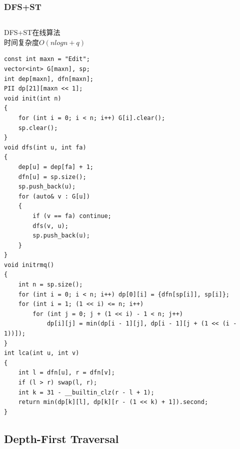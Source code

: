 \documentclass[twoside]{article}
\begin{document}
\subsubsection{DFS+ST}
\begin{lstlisting}
\end{lstlisting}
DFS+ST在线算法\\
时间复杂度$O(nlogn+q)$
\begin{lstlisting}
const int maxn = "Edit";
vector<int> G[maxn], sp;
int dep[maxn], dfn[maxn];
PII dp[21][maxn << 1];
void init(int n)
{
    for (int i = 0; i < n; i++) G[i].clear();
    sp.clear();
}
void dfs(int u, int fa)
{
    dep[u] = dep[fa] + 1;
    dfn[u] = sp.size();
    sp.push_back(u);
    for (auto& v : G[u])
    {
        if (v == fa) continue;
        dfs(v, u);
        sp.push_back(u);
    }
}
void initrmq()
{
    int n = sp.size();
    for (int i = 0; i < n; i++) dp[0][i] = {dfn[sp[i]], sp[i]};
    for (int i = 1; (1 << i) <= n; i++)
        for (int j = 0; j + (1 << i) - 1 < n; j++)
            dp[i][j] = min(dp[i - 1][j], dp[i - 1][j + (1 << (i - 1))]);
}
int lca(int u, int v)
{
    int l = dfn[u], r = dfn[v];
    if (l > r) swap(l, r);
    int k = 31 - __builtin_clz(r - l + 1);
    return min(dp[k][l], dp[k][r - (1 << k) + 1]).second;
}
\end{lstlisting}
\subsection{Depth-First Traversal}
\end{document}
